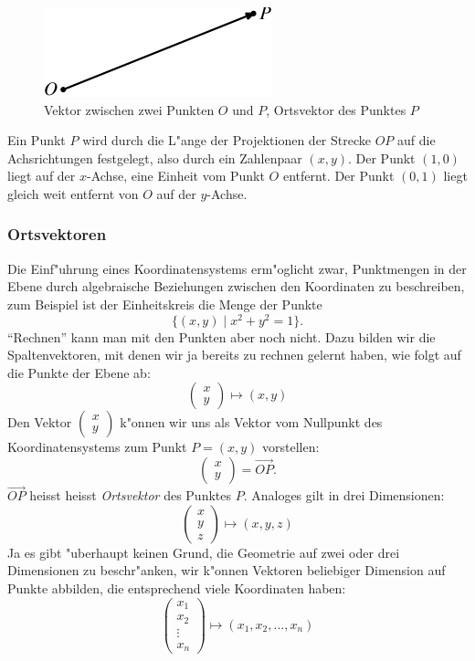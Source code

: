 \begin{figure}
\begin{center}
\includegraphics{images/v-1}
\end{center}
\caption{Vektor zwischen zwei Punkten $O$ und $P$, Ortsvektor des Punktes $P$
\label{image-vektor}}
\end{figure}
Ein Punkt $P$ wird durch die L"ange der Projektionen der Strecke $OP$
auf die Achsrichtungen festgelegt, also durch ein Zahlenpaar $(x,y)$.
Der Punkt $(1,0)$ liegt auf der $x$-Achse, eine Einheit vom Punkt $O$
entfernt.
Der Punkt $(0,1)$ liegt gleich weit entfernt von $O$ auf der $y$-Achse.

\subsubsection{Ortsvektoren}
Die Einf"uhrung eines Koordinatensystems erm"oglicht zwar, Punktmengen
in der Ebene durch algebraische Beziehungen zwischen den Koordinaten
zu beschreiben, zum Beispiel ist der Einheitskreis die Menge der
Punkte
\[
\{(x,y)\;|\;x^2+y^2=1\}.
\]
``Rechnen'' kann man mit den Punkten aber noch nicht.
Dazu bilden wir
die Spaltenvektoren, mit denen wir ja bereits zu rechnen gelernt haben,
wie folgt auf die Punkte der Ebene ab:
\[
\begin{pmatrix}x\\y\end{pmatrix}
\mapsto (x,y)
\]
Den Vektor $\begin{pmatrix}x\\y\end{pmatrix}$ k"onnen wir uns als
Vektor vom Nullpunkt des Koordinatensystems zum Punkt $P=(x,y)$ vorstellen:
\[
\begin{pmatrix}x\\y\end{pmatrix}
=
\overset{\rightarrow}{OP}.
\]
$\overrightarrow{OP}$ heisst
heisst {\em Ortsvektor} des Punktes $P$.
Analoges gilt in drei Dimensionen:
\[
\begin{pmatrix}x\\y\\z\end{pmatrix}
\mapsto
(x,y,z)
\]
Ja es gibt "uberhaupt keinen Grund, die Geometrie auf zwei oder drei
Dimensionen zu beschr"anken, wir k"onnen Vektoren beliebiger Dimension
auf Punkte
abbilden, die entsprechend viele Koordinaten haben:
\[
\begin{pmatrix}
x_1\\x_2\\\vdots\\x_n
\end{pmatrix}
\mapsto
(x_1,x_2,\dots,x_n)
\]

